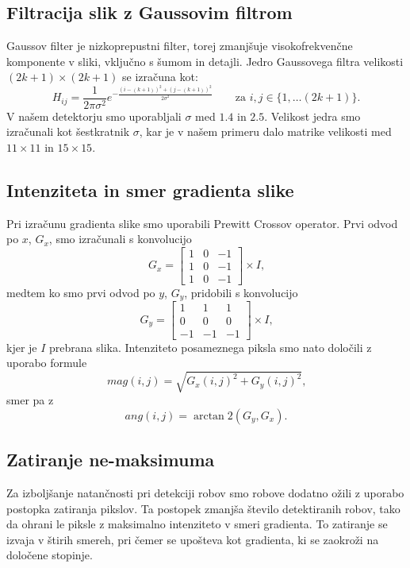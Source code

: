 \documentclass{article}
\begin{document}
    \subsection{Filtracija slik z Gaussovim filtrom}
    Gaussov filter je nizkoprepustni filter, torej zmanjšuje visokofrekvenčne komponente v sliki, vključno s šumom in detajli. 
    Jedro Gaussovega filtra velikosti $(2k+1) \times (2k+1)$ se izračuna kot:
    $$H_{ij} = \frac{1}{2 \pi \sigma^2} e^{- \frac{(i - (k+1))^2 + (j - (k+1))^2}{2 \sigma^2}} \qquad \text{za } i, j \in \{ 1, \dots (2k+1)\} \text{.}$$
    V našem detektorju smo uporabljali $\sigma$ med $1.4$ in $2.5$. Velikost jedra smo izračunali kot šestkratnik $\sigma$, kar je 
    v našem primeru dalo matrike velikosti med $11 \times 11$ in $15 \times 15$. 

    \subsection{Intenziteta in smer gradienta slike}
    Pri izračunu gradienta slike smo uporabili Prewitt Crossov operator. Prvi odvod po $x$, $G_x$, smo izračunali s konvolucijo
    \[ 
    G_x =   
    \begin{bmatrix}
        1 & 0 & -1 \\
        1 & 0 & -1 \\
        1 & 0 & -1 
    \end{bmatrix}
    \times 
    I \text{,}
    \]
    medtem ko smo prvi odvod po $y$, $G_y$, pridobili s konvolucijo
    \[ 
    G_y =     
    \begin{bmatrix}
        1 & 1 & 1 \\
        0 & 0 & 0 \\
        -1 & -1 & -1 
    \end{bmatrix}
    \times 
    I \text{,}
    \]
    kjer je $I$ prebrana slika. Intenziteto posameznega piksla smo nato določili z uporabo formule 
    \[mag(i, j) = \sqrt{G_x(i, j)^2 + G_y(i, j)^2} \text{,}\]
    smer pa z 
    \[ang(i,j) = \arctan2(G_y, G_x) \text{.}\]

    \subsection{Zatiranje ne-maksimuma}
    Za izboljšanje natančnosti pri detekciji robov smo robove dodatno ožili z uporabo postopka zatiranja
    pikslov. Ta postopek zmanjša število detektiranih robov, tako da ohrani le piksle z maksimalno 
    intenziteto v smeri gradienta. To zatiranje se izvaja v štirih smereh, pri čemer se upošteva kot 
    gradienta, ki se zaokroži na določene stopinje.
    
\end{document}
